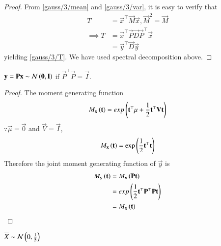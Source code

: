 %
\begin{proof}
From  \eqref{gauss/3/mean} and  \eqref{gauss/3/var}, it is easy to verify that 
\begin{align}
       T&=\vec{x}^{\top}\vec{M}\vec{x},
    \vec{M}^2=\vec{M}
    \\
    \implies T&=\vec{x}^{\top}\vec{P}\vec{D}\vec{P}^{\top}\vec{x}\\
    &=\vec{y}^{\top}\vec{D}\vec{y}
\end{align}
yielding     \eqref{gauss/3/T}.  We have used spectral decomposition above.
%
\end{proof}
\begin{lemma}    
    \label{gauss/3/orth}
    $\mathbf{y}=\mathbf{P}\mathbf{x} \sim \mathcal{N}\left({\mathbf{0}}, {\mathbf{I}} \right)$ if $\vec{P}^{\top}\vec{P} = \vec{I}$.
\end{lemma}
\begin{proof}
    The  moment generating function 
    \begin{align}
        M_{\mathbf{x}}\left(\mathbf{t}\right)=exp\left(\mathbf{t}^{\top}\mathbf{\mu}+\frac{1}{2}\mathbf{t}^{\top}\mathbf{V}\mathbf{t}\right)
    \end{align}
    $\because \vec{\mu}=\vec{0}$ and $\vec{V}=\vec{I}$,
    \begin{align}
         M_{\mathbf{x}}\left(\mathbf{t}\right)=\exp\left(\frac{1}{2}\mathbf{t}^{\top}\mathbf{t}\right)\label{gauss/3/2.11}
    \end{align}
    Therefore the joint moment generating function of $\vec{y}$ is
    \begin{align}
        M_{\mathbf{y}}\left(\mathbf{t}\right)&=M_{\mathbf{x}}\left(\mathbf{P}\mathbf{t}\right)\\
        &=exp\left(\frac{1}{2}\mathbf{t}^{\top}\mathbf{P}^{\top}\mathbf{P}\mathbf{t}\right)
        \\
        &= M_{\mathbf{x}}\left(\mathbf{t}\right)
    \end{align}
    \end{proof}
    \begin{corollary}
        \label{gauss/3/xbar}
        $\overline{X} \sim \mathcal{N}\left({0}, {\frac{1}{5}} \right)$
    \end{corollary}

